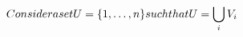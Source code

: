 \documentclass[preview]{standalone}
\begin{document}
\begin{align*}
\special{dvisvgm:raw <g id='unique000'>}Consider a set U = \{1, \dots, n\} such that \special{dvisvgm:raw </g>}\special{dvisvgm:raw <g id='unique001'>}U = \bigcup_{i} V_i\special{dvisvgm:raw </g>}
\end{align*}
\end{document}
